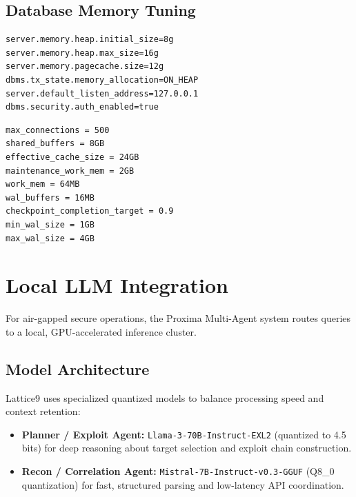 \documentclass[11pt,a4paper]{article}
\theoremstyle{definition}
\numberwithin{equation}{section}
\begin{document}
\subsection{Database Memory Tuning}\label{subsec:db-tuning}

\begin{lstlisting}[style=latticecode,title={\textsf{Neo4j Configuration (neo4j.conf)}}]
server.memory.heap.initial_size=8g
server.memory.heap.max_size=16g
server.memory.pagecache.size=12g
dbms.tx_state.memory_allocation=ON_HEAP
server.default_listen_address=127.0.0.1
dbms.security.auth_enabled=true
\end{lstlisting}

\begin{lstlisting}[style=latticecode,title={\textsf{PostgreSQL Configuration (postgresql.conf)}}]
max_connections = 500
shared_buffers = 8GB
effective_cache_size = 24GB
maintenance_work_mem = 2GB
work_mem = 64MB
wal_buffers = 16MB
checkpoint_completion_target = 0.9
min_wal_size = 1GB
max_wal_size = 4GB
\end{lstlisting}

\section{Local LLM Integration}\label{sec:llm}

For air-gapped secure operations, the Proxima Multi-Agent system routes queries to a local, GPU-accelerated inference cluster.

\subsection{Model Architecture}\label{subsec:models}

Lattice9 uses specialized quantized models to balance processing speed and context retention:
\begin{itemize}[leftmargin=2em]
    \item \textbf{Planner / Exploit Agent:} \texttt{Llama-3-70B-Instruct-EXL2} (quantized to 4.5 bits) for deep reasoning about target selection and exploit chain construction.
    \item \textbf{Recon / Correlation Agent:} \texttt{Mistral-7B-Instruct-v0.3-GGUF} (Q8\_0 quantization) for fast, structured parsing and low-latency API coordination.
\end{itemize}
\end{document}
